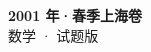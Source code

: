 \documentclass[zihao=-4, a4paper]{ctexart}
\begin{document}
\begin{center}
  {\Large\bfseries 2001 年·春季上海卷}\\[4pt]
  {\large 数学 · 试题版}
\end{center}
\medskip
{}

\end{document}
